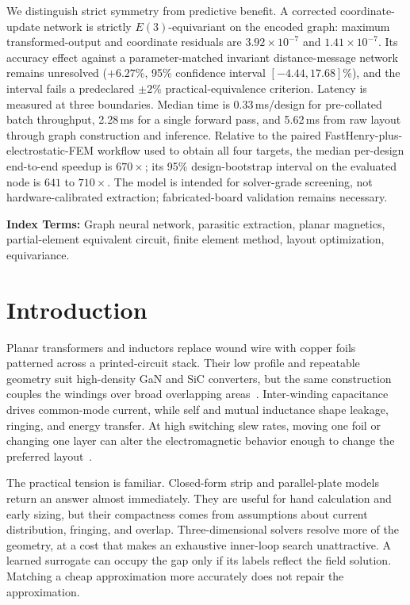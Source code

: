 \documentclass[letterpaper,twocolumn,9pt]{extarticle}
\begin{document}
We distinguish strict symmetry from predictive benefit. A corrected coordinate-update network is strictly $E(3)$-equivariant on the encoded graph: maximum transformed-output and coordinate residuals are $3.92\times10^{-7}$ and $1.41\times10^{-7}$. Its accuracy effect against a parameter-matched invariant distance-message network remains unresolved ($+6.27$\%, 95\% confidence interval $[-4.44,17.68]$\%), and the interval fails a predeclared $\pm2$\% practical-equivalence criterion. Latency is measured at three boundaries. Median time is 0.33\,ms/design for pre-collated batch throughput, 2.28\,ms for a single forward pass, and 5.62\,ms from raw layout through graph construction and inference. Relative to the paired FastHenry-plus-electrostatic-FEM workflow used to obtain all four targets, the median per-design end-to-end speedup is $670\times$; its 95\% design-bootstrap interval on the evaluated node is $641$ to $710\times$. The model is intended for solver-grade screening, not hardware-calibrated extraction; fabricated-board validation remains necessary.

\vspace{4pt}
\noindent\textbf{Index Terms:} Graph neural network, parasitic extraction, planar magnetics, partial-element equivalent circuit, finite element method, layout optimization, equivariance.

\section{Introduction}
Planar transformers and inductors replace wound wire with copper foils patterned across a printed-circuit stack. Their low profile and repeatable geometry suit high-density GaN and SiC converters, but the same construction couples the windings over broad overlapping areas~\cite{ouyang,hurley,mclyman,erickson}. Inter-winding capacitance drives common-mode current, while self and mutual inductance shape leakage, ringing, and energy transfer. At high switching slew rates, moving one foil or changing one layer can alter the electromagnetic behavior enough to change the preferred layout~\cite{ott,paul}.

The practical tension is familiar. Closed-form strip and parallel-plate models return an answer almost immediately. They are useful for hand calculation and early sizing, but their compactness comes from assumptions about current distribution, fringing, and overlap. Three-dimensional solvers resolve more of the geometry, at a cost that makes an exhaustive inner-loop search unattractive. A learned surrogate can occupy the gap only if its labels reflect the field solution. Matching a cheap approximation more accurately does not repair the approximation.
\end{document}

